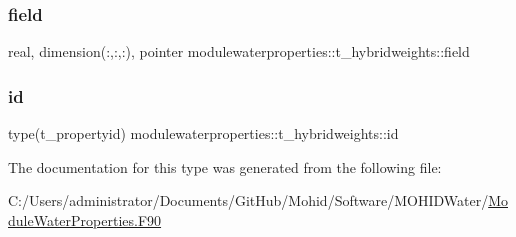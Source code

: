 \subsubsection{\texorpdfstring{field}{field}}
{\footnotesize\ttfamily real, dimension(\+:,\+:,\+:), pointer modulewaterproperties\+::t\+\_\+hybridweights\+::field\hspace{0.3cm}{\ttfamily [private]}}

\mbox{\label{structmodulewaterproperties_1_1t__hybridweights_ae0583eb35c55b8effec392e96a73eb9c}} 
\subsubsection{\texorpdfstring{id}{id}}
{\footnotesize\ttfamily type(t\+\_\+propertyid) modulewaterproperties\+::t\+\_\+hybridweights\+::id\hspace{0.3cm}{\ttfamily [private]}}



The documentation for this type was generated from the following file\+:\begin{DoxyCompactItemize}
\item 
C\+:/\+Users/administrator/\+Documents/\+Git\+Hub/\+Mohid/\+Software/\+M\+O\+H\+I\+D\+Water/\mbox{\hyperlink{_module_water_properties_8_f90}{Module\+Water\+Properties.\+F90}}\end{DoxyCompactItemize}
